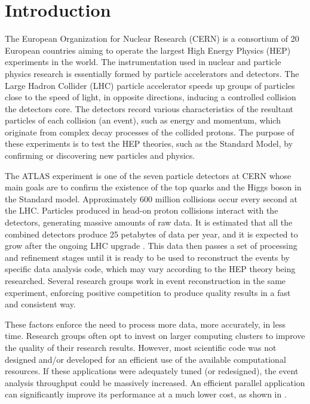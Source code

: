 \section{Introduction}
\label{introduction}

The European Organization for Nuclear Research (CERN) is a consortium of 20 European countries aiming to operate the largest High Energy Physics (HEP) experiments in the world. The instrumentation used in nuclear and particle physics research is essentially formed by particle accelerators and detectors. The Large Hadron Collider (LHC) particle accelerator speeds up groups of particles close to the speed of light, in opposite directions, inducing a controlled collision the detectors core. The detectors record various characteristics of the resultant particles of each collision (an event), such as energy and momentum, which originate from complex decay processes of the collided protons. The purpose of these experiments is to test the HEP theories, such as the Standard Model, by confirming or discovering new particles and physics.

The ATLAS experiment is one of the seven particle detectors at CERN whose main goals are to confirm the existence of the top quarks and the Higgs boson in the Standard model. Approximately 600 million collisions occur every second at the LHC. Particles produced in head-on proton collisions interact with the detectors, generating massive amounts of raw data. It is estimated that all the combined detectors produce 25 petabytes of data per year, and it is expected to grow after the ongoing LHC upgrade \cite{LIP:Ibergrid}. This data then passes a set of processing and refinement stages until it is ready to be used to reconstruct the events by specific data analysis code, which may vary according to the HEP theory being researched. Several research groups work in event reconstruction in the same experiment, enforcing positive competition to produce quality results in a fast and consistent way.

These factors enforce the need to process more data, more accurately, in less time. Research groups often opt to invest on larger computing clusters to improve the quality of their research results. However, most scientific code was not designed and/or developed for an efficient use of the available computational resources. If these applications were adequately tuned (or redesigned), the event analysis throughput could be massively increased. An efficient parallel application can significantly improve its performance at a much lower cost, as shown in \cite{Msc:AMP}.

